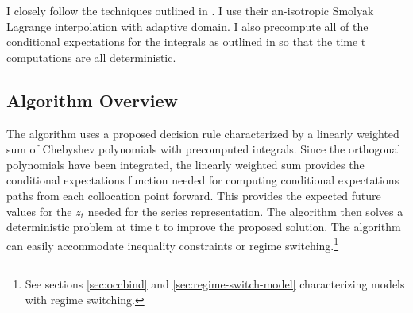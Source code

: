 \documentclass[12pt]{article}
\begin{document}
I closely follow the techniques outlined in \cite{Judd2013,Judd2014}. 
I use their an-isotropic Smolyak Lagrange interpolation with adaptive domain.
I also precompute all of the conditional expectations for the integrals as outlined in \cite{JuddIntegrals} so that the time t computations are all 
deterministic.




\subsection{Algorithm Overview}

 \label{sec:unknown-solutions}
The algorithm uses a proposed decision rule characterized by a linearly weighted sum of Chebyshev polynomials with precomputed integrals.  Since the
orthogonal polynomials have been integrated, the linearly weighted sum provides
the conditional expectations function needed for computing conditional expectations paths from each collocation point forward.  This provides the 
expected future values for the $z_t$ needed for the series representation.
The algorithm then solves
a deterministic problem at time t to improve the proposed solution.
The algorithm can easily accommodate inequality
constraints or regime switching.\footnote{See sections \ref{sec:occbind} and \ref{sec:regime-switch-model} characterizing  models with regime switching.}
\end{document}
